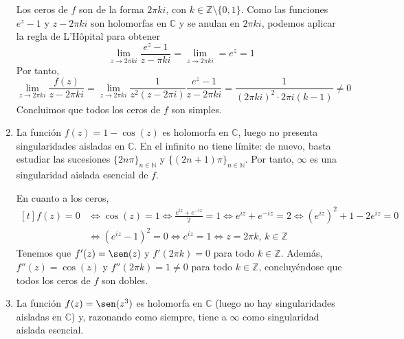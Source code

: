 \documentclass[11pt]{report}
\makeatletter
\renewenvironment{proof}[1][\proofname]{\par
  \pushQED{\qed}%
  \normalfont \topsep\z@skip %
  \trivlist
  \item[\hskip\labelsep
        \itshape
    #1\@addpunct{.}]\ignorespaces
}{%
  \popQED\endtrivlist\@endpefalse
}
\newcommand{\N}{\mathbb N}
\newcommand{\Z}{\mathbb Z}
\newcommand{\C}{\mathbb C}
\makeatother
\begin{document}
\begin{proof}
\begin{enumerate}
    Los ceros de $f$ son de la forma $2\pi k i$, con $k \in \Z \setminus \{0,1\}$. Como las funciones $e^z-1$ y $z-2\pi k i$ son holomorfas en $\C$ y se anulan en $2 \pi k i$, podemos aplicar la regla de L'Hôpital para obtener
    \[\lim_{z \to 2\pi k i} \frac{e^z-1}{z-\pi k i} = \lim_{z \to 2\pi k i} = e^z = 1\]
    Por tanto,
    \[\lim_{z \to 2 \pi k i} \frac{f(z)}{z-2\pi k i} = \lim_{z \to 2\pi k i}\frac{1}{z^2(z-2\pi i)}\frac{e^z-1}{z-2\pi k i} = \frac{1}{(2\pi k i)^2\cdot 2\pi i(k-1)} \neq 0\]
    Concluimos que todos los ceros de $f$ son simples.
    \item La función $f(z)=1-\cos(z)$ es holomorfa en $\C$, luego no presenta singularidades aisladas en $\C$. En el infinito no tiene límite: de nuevo, basta estudiar las sucesiones $\{2n\pi \}_{n \in \N}$ y $\{(2n+1)\pi\}_{n \in \N}$. Por tanto, $\infty$ es una singularidad aislada esencial de $f$. 
    
    En cuanto a los ceros, 
    \[\begin{aligned}[t]f(z)=0 &\iff \cos(z)=1 \iff \frac{e^{iz}+e^{-iz}}{2} = 1\iff e^{iz}+e^{-iz} = 2 \iff (e^{iz})^2+1-2e^{iz}=0 \\ &\iff (e^{iz}-1)^2=0 \iff e^{iz} = 1 \iff z = 2\pi k, \, k \in \Z\end{aligned}\]
    Tenemos que $f'(z)=\sen(z)$ y $f'(2\pi k) = 0$ para todo $k \in \Z$. Además, $f''(z)=\cos(z)$ y $f''(2\pi k) = 1 \neq 0$ para todo $k\in \Z$, concluyéndose que todos los ceros de $f$ son dobles.
    \item La función $f(z)=\sen(z^3)$ es holomorfa en $\C$ (luego no hay singularidades aisladas en $\C$) y, razonando como siempre, tiene a $\infty$ como singularidad aislada esencial. 
    

\end{enumerate}
\end{proof}
\end{document}
